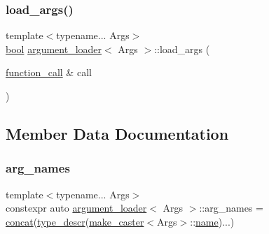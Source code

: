 \mbox{\label{classargument__loader_ac5cff5197a03f99f06169af9f43d6537}} 
\subsubsection{\texorpdfstring{load\_args()}{load\_args()}}
{\footnotesize\ttfamily template$<$typename... Args$>$ \\
\mbox{\hyperlink{asdl_8h_af6a258d8f3ee5206d682d799316314b1}{bool}} \mbox{\hyperlink{classargument__loader}{argument\+\_\+loader}}$<$ Args $>$\+::load\+\_\+args (\begin{DoxyParamCaption}\item[{\mbox{\hyperlink{structfunction__call}{function\+\_\+call}} \&}]{call }\end{DoxyParamCaption})\hspace{0.3cm}{\ttfamily [inline]}}



\subsection{Member Data Documentation}
\mbox{\label{classargument__loader_a48c33de6037140357b1ba8fd154cff59}} 
\subsubsection{\texorpdfstring{arg\_names}{arg\_names}}
{\footnotesize\ttfamily template$<$typename... Args$>$ \\
constexpr auto \mbox{\hyperlink{classargument__loader}{argument\+\_\+loader}}$<$ Args $>$\+::arg\+\_\+names = \mbox{\hyperlink{descr_8h_a0d8d147b3e705401458d3caec882e855}{concat}}(\mbox{\hyperlink{descr_8h_a65529edb79d0d99ef5b83524e2e0b0dc}{type\+\_\+descr}}(\mbox{\hyperlink{cast_8h_ab32b52411a6b07420516d79074815713}{make\+\_\+caster}}$<$Args$>$\+::\mbox{\hyperlink{structname}{name}})...)\hspace{0.3cm}{\ttfamily [static]}}

\mbox{\label{classargument__loader_a9436dd2f1d26de4dcfb7e5f7edffef93}} 
